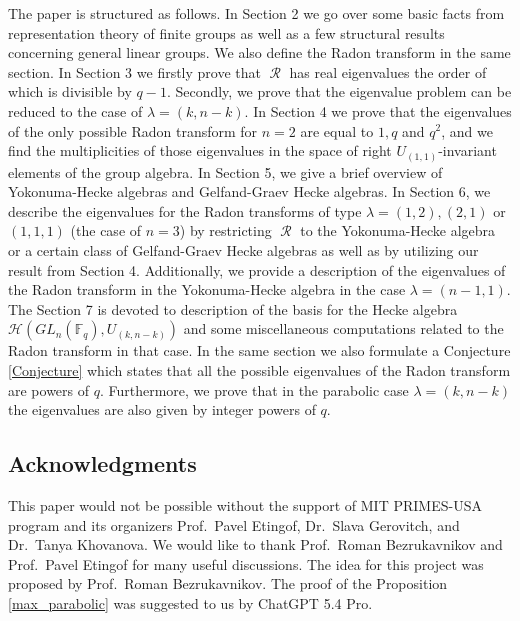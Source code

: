 \documentclass[12pt,reqno]{amsart}
\theoremstyle{definition}
\theoremstyle{remark}
\numberwithin{equation}{section}
\newcommand{\GL}[1]{GL_{#1}(\mathbb{F}_q)}
\DeclareMathOperator{\R}{\mathcal{R}}
\begin{document}



The paper is structured as follows. In Section 2 we go over some basic facts from representation theory of finite groups as well as a few structural results concerning general linear groups. We also define the Radon transform in the same section. In Section 3 we firstly prove that $\R$ has real eigenvalues the order of which is divisible by $q-1$. Secondly, we prove that the eigenvalue problem can be reduced to the case of $\lambda=(k,n-k)$. In Section 4 we prove that the eigenvalues of the only possible Radon transform for $n=2$ are equal to $1,q$ and $q^2$, and we find the multiplicities of those eigenvalues in the space of right $U_{(1,1)}$-invariant elements of the group algebra. In Section 5, we give a brief overview of Yokonuma-Hecke algebras and Gelfand-Graev Hecke algebras. In Section 6, we describe the eigenvalues for the Radon transforms of type $\lambda=(1,2),(2,1)$ or $(1,1,1)$ (the case of $n=3$) by restricting $\R$ to the Yokonuma-Hecke algebra or a certain class of Gelfand-Graev Hecke algebras as well as by utilizing our result from Section 4. Additionally, we provide a description of the eigenvalues of the Radon transform in the Yokonuma-Hecke algebra in the case $\lambda=(n-1,1)$. The Section 7 is devoted to description of the basis for the Hecke algebra $\mathcal{H}(\GL{n},U_{(k,n-k)})$ and some miscellaneous computations related to the Radon transform in that case. In the same section we also formulate a Conjecture \ref{Conjecture} which states that all the possible eigenvalues of the Radon transform are powers of $q$. Furthermore, we prove that in the parabolic case $\lambda=(k,n-k)$ the eigenvalues are also given by integer powers of $q$.\\

\subsection{Acknowledgments} This paper would not be possible without the support of MIT PRIMES-USA program and its organizers Prof.~Pavel Etingof, Dr.~Slava Gerovitch, and Dr.~Tanya Khovanova. We would like to thank Prof.~Roman Bezrukavnikov and  Prof.~Pavel Etingof for many useful discussions. The idea for this project was proposed by Prof.~Roman Bezrukavnikov. The proof of the Proposition \ref{max_parabolic} was suggested to us by ChatGPT 5.4 Pro.  %
\end{document}
